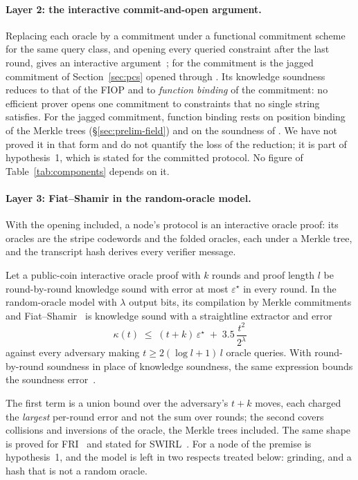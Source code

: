 \paragraph{Layer 2: the interactive commit-and-open argument.} Replacing each oracle by a commitment under a functional commitment scheme for the same query class, and opening every queried constraint after the last round, gives an interactive argument~\citep{funky26}; for \Ziren{} the commitment is the jagged commitment of Section~\ref{sec:pcs} opened through \WHIR{}. Its knowledge soundness reduces to that of the FIOP and to \emph{function binding} of the commitment: no efficient prover opens one commitment to constraints that no single string satisfies. For the jagged \WHIR{} commitment, function binding rests on position binding of the Merkle trees (\S\ref{sec:prelim-field}) and on the soundness of \WHIR{}. We have not proved it in that form and do not quantify the loss of the reduction; it is part of hypothesis~1, which is stated for the committed protocol. No figure of Table~\ref{tab:components} depends on it.

\paragraph{Layer 3: Fiat--Shamir in the random-oracle model.} With the opening included, a node's protocol is an interactive oracle proof: its oracles are the stripe codewords and the folded oracles, each under a Merkle tree, and the transcript hash derives every verifier message.

\begin{theorem}
\label{thm:bcs}
Let a public-coin interactive oracle proof with $k$ rounds and proof length $l$ be round-by-round knowledge sound with error at most $\varepsilon^\star$ in every round. In the random-oracle model with $\lambda$ output bits, its compilation by Merkle commitments and Fiat--Shamir~\citep{bcs16} is knowledge sound with a straightline extractor and error
\[
  \kappa(t) \;\le\; (t + k)\,\varepsilon^\star \;+\; 3.5\,\frac{t^2}{2^{\lambda}}
\]
against every adversary making $t \ge 2(\log l + 1)\, l$ oracle queries. With round-by-round soundness in place of knowledge soundness, the same expression bounds the soundness error~\citep[Thms.~25.2.1 and~31.2.1]{chiesa-yogev}.
\end{theorem}

The first term is a union bound over the adversary's $t + k$ moves, each charged the \emph{largest} per-round error and not the sum over rounds; the second covers collisions and inversions of the oracle, the Merkle trees included. The same shape is proved for FRI~\citep[Cor.~4]{bgkttz23} and stated for SWIRL~\citep[Cor.~4.2.6]{swirl}. For a node of \Ziren{} the premise is hypothesis~1, and the model is left in two respects treated below: grinding, and a hash that is not a random oracle.

